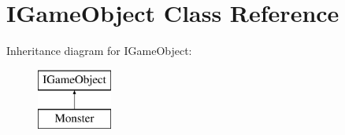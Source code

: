 \hypertarget{class_i_game_object}{\section{I\+Game\+Object Class Reference}
\label{class_i_game_object}
}
Inheritance diagram for I\+Game\+Object\+:\begin{figure}[H]
\begin{center}
\leavevmode
\includegraphics[height=2.000000cm]{class_i_game_object}
\end{center}
\end{figure}
